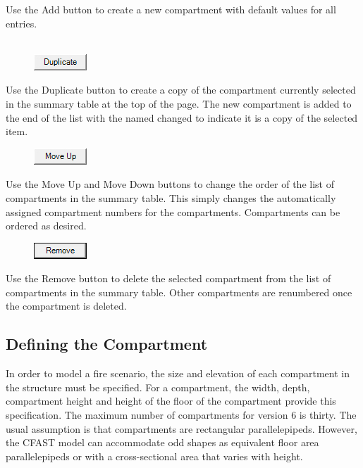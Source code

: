 Use the Add button to create a new compartment with default values for all entries. \\~ \\

\begin{figure}
  \includegraphics[width=0.781in]{FIGURES/Input_File/Duplicate_Button}
\end{figure}

Use the Duplicate button to create a copy of the compartment currently selected in the summary table at the top of the page. The new compartment is added to the end of the list with the named changed to indicate it is a copy of the selected item. \\

\begin{figure}
  \includegraphics[width=0.781in]{FIGURES/Input_File/Move_Up_Button}
\end{figure}

Use the Move Up and Move Down buttons to change the order of the list of compartments in the summary table. This simply changes the automatically assigned compartment numbers for the compartments. Compartments can be ordered as desired.

\begin{figure}
  \includegraphics[width=0.781in]{FIGURES/Input_File/Remove_Button}
\end{figure}

Use the Remove button to delete the selected compartment from the list of compartments in the summary table.  Other compartments are renumbered once the compartment is deleted.

\subsection{Defining the Compartment}

In order to model a fire scenario, the size and elevation of each compartment in the structure must be specified. For a compartment, the width, depth, compartment height and height of the floor of the compartment provide this specification. The maximum number of compartments for version 6 is thirty. The usual assumption is that compartments are rectangular parallelepipeds. However, the CFAST model can accommodate odd shapes as equivalent floor area parallelepipeds or with a cross-sectional area that varies with height.

